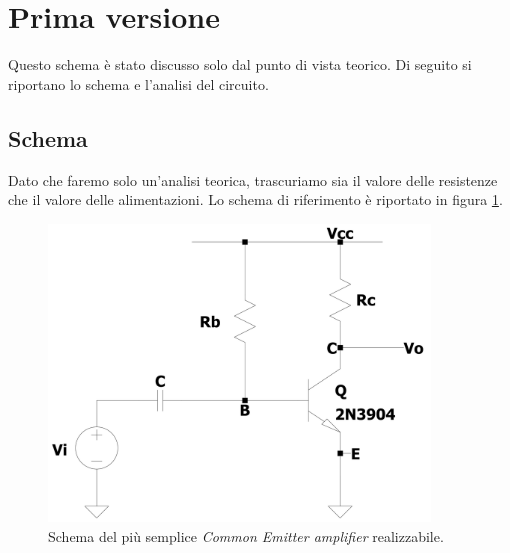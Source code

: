 \documentclass{report}
\begin{document}
\section{Prima versione} %
\label{CEv1_cap}
Questo schema è stato discusso solo dal punto di vista teorico. Di seguito si riportano lo schema e l'analisi del circuito. 
\subsection{Schema} 
Dato che faremo solo un'analisi teorica, trascuriamo sia il valore delle resistenze che il valore delle alimentazioni. Lo schema di riferimento è riportato in figura \ref{figura:CEv1}.
\begin{figure}[h]
\centering
\includegraphics[height=7.9cm]{immagini/CEv1}
\caption{Schema del più semplice \textit{Common Emitter amplifier} realizzabile.}
\label{figura:CEv1}
\end{figure}
\end{document}
